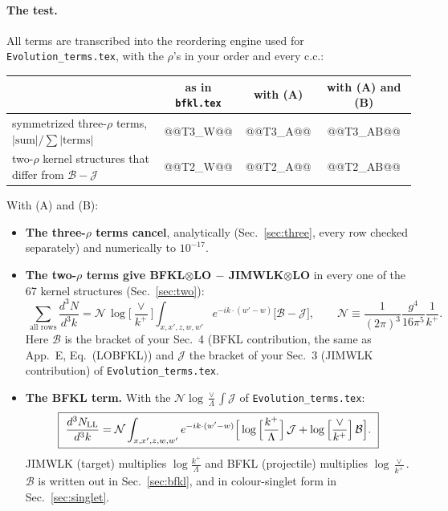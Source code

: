 \documentclass[10pt]{article}
\numberwithin{equation}{section}
\newcommand{\NN}{\mathcal N}
\newcommand{\BB}{\mathcal B}
\newcommand{\JJ}{\mathcal J}
\newcommand{\Lv}{\log\Big[\frac{\vee}{k^+}\Big]}
\newcommand{\pre}{\frac{1}{(2\pi)^3}}
\newcommand{\phw}{e^{-ik\cdot(w'-w)}}
\begin{document}
\paragraph{The test.} All terms are transcribed into the reordering engine used for \texttt{Evolution\_terms.tex}, with the $\rho$'s in your order and every c.c.:
\begin{center}\small
\begin{tabular}{@{}lccc@{}}\toprule
 & as in \texttt{bfkl.tex} & with (A) & with (A) and (B)\\\midrule
symmetrized three-$\rho$ terms, $|\text{sum}|/\sum|\text{terms}|$ & @@T3_W@@ & @@T3_A@@ & @@T3_AB@@\\
two-$\rho$ kernel structures that differ from $\BB-\JJ$ & @@T2_W@@ & @@T2_A@@ & @@T2_AB@@\\\bottomrule
\end{tabular}
\end{center}
With (A) and (B):
\begin{itemize}
\item \textbf{The three-$\rho$ terms cancel}, analytically (Sec.~\ref{sec:three}, every row checked separately) and numerically to $10^{-17}$.
\item \textbf{The two-$\rho$ terms give BFKL$\otimes$LO $-$ JIMWLK$\otimes$LO} in every one of the 67 kernel structures (Sec.~\ref{sec:two}):
\begin{equation}
\boxed{\ \sum_{\text{all rows}}\frac{d^3N}{d^3k}=\NN\,\Lv\int_{x,x',z,w,w'}\phw\Big[\BB-\JJ\Big],\qquad \NN\equiv\pre\frac{g^4}{16\pi^5}\frac{1}{k^+}.\ }
\label{eq:main}
\end{equation}
Here $\BB$ is the bracket of your Sec.~4 (BFKL contribution, the same as App.~E, Eq.~(LOBFKL)) and $\JJ$ the bracket of your Sec.~3 (JIMWLK contribution) of \texttt{Evolution\_terms.tex}.
\item \textbf{The BFKL term.} With the $\NN\log\frac{\vee}{\Lambda}\int\JJ$ of \texttt{Evolution\_terms.tex}:
\begin{equation}
\boxed{\ \frac{d^3N_{\rm LL}}{d^3k}=\NN\int_{x,x',z,w,w'}\phw\Big[\log\Big[\frac{k^+}{\Lambda}\Big]\,\JJ+\log\Big[\frac{\vee}{k^+}\Big]\,\BB\Big].\ }
\label{eq:LL}
\end{equation}
JIMWLK (target) multiplies $\log\frac{k^+}{\Lambda}$ and BFKL (projectile) multiplies $\log\frac{\vee}{k^+}$. $\BB$ is written out in Sec.~\ref{sec:bfkl}, and in colour-singlet form in Sec.~\ref{sec:singlet}.
\end{itemize}

\end{document}
